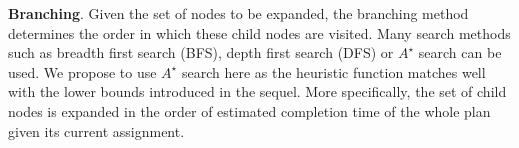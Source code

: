 \textbf{Branching}.
Given the set of nodes to be expanded,
the branching method determines the order in which these child nodes are
visited.
Many search methods such as breadth first search (BFS), depth first search (DFS)
or $A^\star$ search can be used.
We propose to use $A^\star$ search here as the heuristic function matches well
with the lower bounds introduced in the sequel.
More specifically, the set of child nodes is expanded in the order of
estimated completion time of the whole plan given its current assignment.


